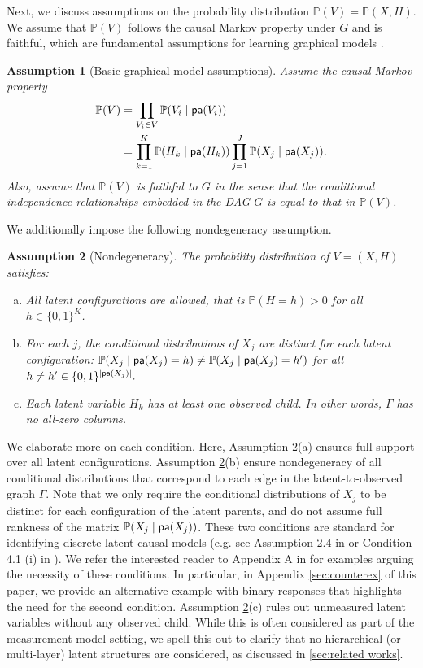 \documentclass[10pt]{article} %
\newtheorem{assumption}{Assumption}
\newcommand{\PP}{\mathbb P}
\newcommand{\pa}{\textsf{\upshape pa}}
\begin{document}
Next, we discuss assumptions on the probability distribution $\PP(V) = \PP(X,H)$. We assume that $\PP(V)$ follows the causal Markov property under $G$ and is faithful, which are fundamental assumptions for learning graphical models \citep{spirtes2001causation}. 
\begin{assumption}[Basic graphical model assumptions]\label{assmp:causal markov}
    Assume the causal Markov property 
    \begin{align*}
        \PP(V) &= \prod_{V_i \in V}\PP(V_i \mid \pa(V_i)) \\
        &= \prod_{k=1}^K \PP(H_k \mid \pa(H_k)) \prod_{j=1}^J \PP(X_j \mid \pa(X_j)).
    \end{align*}
    Also, assume that $\PP(V)$ is faithful to $G$ in the sense that the conditional independence relationships embedded in the DAG $G$ is equal to that in $\PP(V)$.
\end{assumption}

We additionally impose the following nondegeneracy assumption.

\begin{assumption}[Nondegeneracy]\label{assmp:nondegenerate}
The probability distribution of $V=(X,H)$ satisfies:
\begin{enumerate}[(a)]
    \item All latent configurations are allowed, that is $\PP(H = h) > 0$ for all $h \in \{0,1\}^K$.
    \item For each $j$, the conditional distributions of $X_j$ are distinct for each latent configuration: $\PP(X_j \mid \pa(X_j) = h) \neq \PP(X_j \mid \pa(X_j) = h')$ for all $h \neq h' \in \{0,1\}^{|\pa(X_j)|}.$
    \item Each latent variable $H_k$ has at least one observed child. In other words, $\Gamma$ has no all-zero columns.
\end{enumerate}
\end{assumption}

We elaborate more on each condition. Here, Assumption \ref{assmp:nondegenerate}(a) ensures full support over all latent configurations. Assumption \ref{assmp:nondegenerate}(b) ensure nondegeneracy of all conditional distributions that correspond to each edge in the latent-to-observed graph $\Gamma$. Note that we only require the conditional distributions of $X_j$ to be distinct for each configuration of the latent parents, and do not assume full rankness of the matrix $\PP(X_j \mid \pa(X_j))$. %
These two conditions are standard for identifying discrete latent causal models (e.g. see Assumption 2.4 in \cite{kivva2021learning} or Condition 4.1 (i) in \cite{chen2024learning}). We refer the interested reader to Appendix A in \cite{kivva2021learning} for examples arguing the necessity of these conditions. In particular, in Appendix \ref{sec:counterex} of this paper, we provide an alternative example with binary responses that highlights the need for the second condition.
%
Assumption \ref{assmp:nondegenerate}(c) rules out unmeasured latent variables without any observed child. While this is often considered as part of the measurement model setting, we spell this out to clarify that no hierarchical (or multi-layer) latent structures are considered, as discussed in \cref{sec:related works}. 
\end{document}
